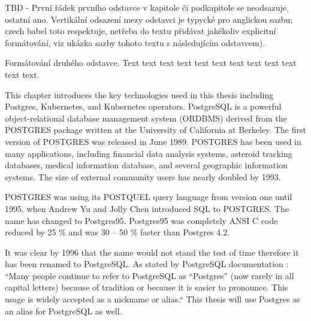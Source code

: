 
TBD - První řádek prvního odstavce v kapitole či podkapitole se neodsazuje, ostatní ano. Vertikální odsazení mezy odstavci je typycké pro anglickou sazbu; czech babel toto respektuje, netřeba do textu přidávat jakékoliv explicitní formátování, viz ukázka sazby tohoto textu s následujícím odstavcem).

Formátování druhého odstavce. Text text text text text text text text text text text text.



This chapter introduces the key technologies used in this thesis including Postgres, Kubernetes, and Kubernetes operators. 
PostgreSQL is a powerful object-relational database management system (ORDBMS) derived from the POSTGRES package written at the University of California at Berkeley. The first version of POSTGRES was released in June 1989. POSTGRES has been used in many applications, including financial data analysis systems, asteroid tracking databases, medical information database, and several geographic information systems. The size of external community users has nearly doubled by 1993.\cite{the_postgresql_global_development_group_postgresql_2022}
    
 POSTGRES was using its POSTQUEL query language from version one until 1995, when Andrew Yu and Jolly Chen introduced SQL to POSTGRES. The name has changed to Postgres95. Postgres95 was completely ANSI C code reduced by 25 \% and was 30 – 50 \% faster than Postgres 4.2.  \cite{the_postgresql_global_development_group_postgresql_2022}

It was clear by 1996 that the name would not stand the test of time therefore it has been renamed to PostgreSQL. As stated by PostgreSQL documentation \cite{the_postgresql_global_development_group_postgresql_2022}: “Many people continue to refer to PostgreSQL as “Postgres” (now rarely in all capital letters) because of tradition or because it is easier to pronounce. This usage is widely accepted as a nickname or alias.“ This thesis will use Postgres as an alias for PostgreSQL as well. 
\cite{the_postgresql_global_development_group_postgresql_2022}

